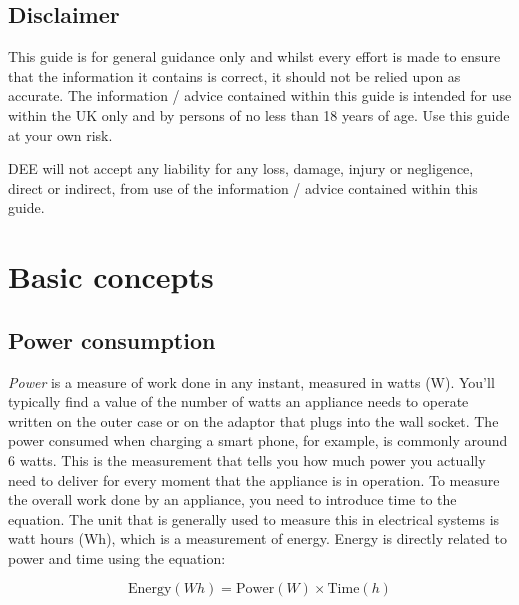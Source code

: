 \documentclass{article}
\theoremstyle{definition}
\theoremstyle{definition}
\theoremstyle{remark}
\begin{document}
  \subsection{Disclaimer} %
  \label{sub:disclaimer}

    This guide is for general guidance only and whilst every effort is made to ensure that the information it contains is correct, it should not be relied upon as accurate. The information / advice contained within this guide is intended for use within the UK only and by persons of no less than 18 years of age. Use this guide at your own risk.
    
    DEE will not accept any liability for any loss, damage, injury or negligence, direct or indirect, from use of the information / advice contained within this guide.
  

  \newpage  


\section{Basic concepts} %
\label{sec:basic_concepts}
  
  \subsection{Power consumption} %
  \label{sub:power_consumption}

    \textit{Power} is a measure of work done in any instant, measured in watts (W). You'll typically find a value of the number of watts an appliance needs to operate written on the outer case or on the adaptor that plugs into the wall socket. The power consumed when charging a smart phone, for example, is commonly around 6 watts. This is the measurement that tells you how much power you actually need to deliver for every moment that the appliance is in operation. To measure the overall work done by an appliance, you need to introduce time to the equation. The unit that is generally used to measure this in electrical systems is watt hours (Wh), which is a measurement of energy. Energy is directly related to power and time using the equation: 

    \begin{equation}
      \text{Energy} (Wh) = \text{Power} (W) \times \text{Time} (h)
    \end{equation}
    
\end{document}
